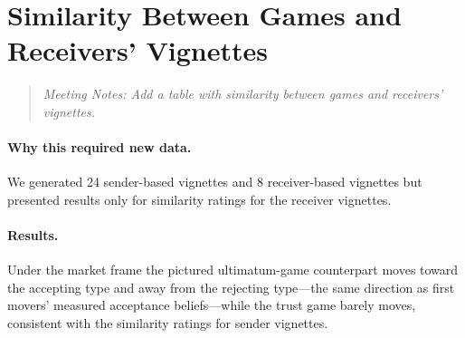\documentclass[11pt]{article}
\begin{document}

\section{Similarity Between Games and Receivers' Vignettes}

\begin{quote}\itshape
Meeting Notes: Add a table with similarity between games and receivers' vignettes.
\end{quote}

\paragraph{Why this required new data.} We generated 24 sender-based vignettes and 8 receiver-based vignettes but presented results only for similarity ratings for the receiver vignettes.

\paragraph{Results.} Under the market frame the pictured ultimatum-game counterpart moves toward the accepting type and away from the rejecting type---the same direction as first movers' measured acceptance beliefs---while the trust game
barely moves, consistent with the similarity ratings for sender vignettes. 
\end{document}
